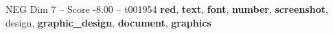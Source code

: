 \begin{textsample}{NEG Dim 7 – Score -8.00 – t001954}  \label{ex:f7_neg_011}
\textbf{red}, \textbf{text}, \textbf{font}, \textbf{number}, \textbf{screenshot}, design, \textbf{graphic\_design}, \textbf{document}, \textbf{graphics}

\end{textsample}
